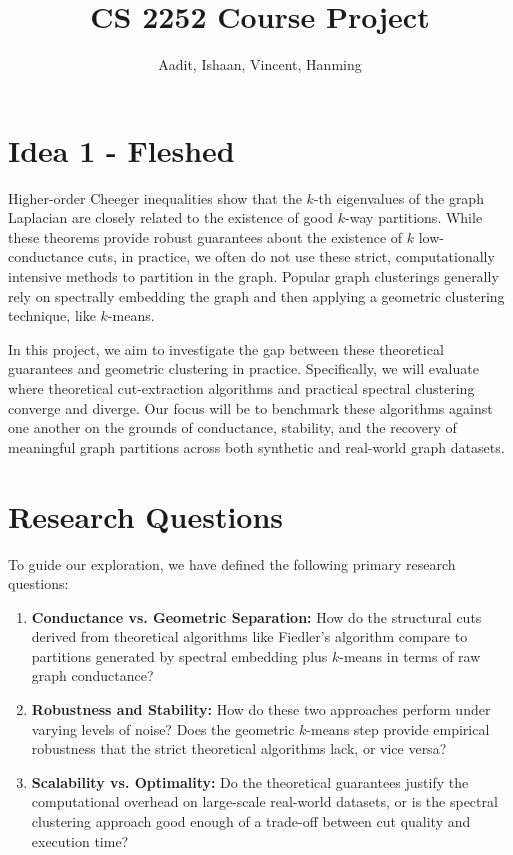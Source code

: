 \documentclass{article}
\title{CS 2252 Course Project}
\author{%
Aadit, Ishaan, Vincent, Hanming
\\
}
\begin{document}
\maketitle



\section{Idea 1 - Fleshed}

Higher-order Cheeger inequalities show that the $k$-th eigenvalues of the graph Laplacian are closely related to the existence of good $k$-way partitions. While these theorems provide robust guarantees about the existence of $k$ low-conductance cuts, in practice, we often do not use these strict, computationally intensive methods to partition in the graph. Popular graph clusterings generally rely on spectrally embedding the graph and then applying a geometric clustering technique, like $k$-means.

In this project, we aim to investigate the gap between these theoretical guarantees and geometric clustering in practice. Specifically, we will evaluate where theoretical cut-extraction algorithms and practical spectral clustering converge and diverge. Our focus will be to benchmark these algorithms against one another on the grounds of conductance, stability, and the recovery of meaningful graph partitions across both synthetic and real-world graph datasets.

\section{Research Questions}
To guide our exploration, we have defined the following primary research questions:
\begin{enumerate}
    \item \textbf{Conductance vs. Geometric Separation:} How do the structural cuts derived from theoretical algorithms like Fiedler's algorithm compare to partitions generated by spectral embedding plus $k$-means in terms of raw graph conductance?
    \item \textbf{Robustness and Stability:} How do these two approaches perform under varying levels of noise? Does the geometric $k$-means step provide empirical robustness that the strict theoretical algorithms lack, or vice versa?
    \item \textbf{Scalability vs. Optimality:} Do the theoretical guarantees justify the computational overhead on large-scale real-world datasets, or is the spectral clustering approach good enough of a trade-off between cut quality and execution time?
\end{enumerate}
\end{document}
